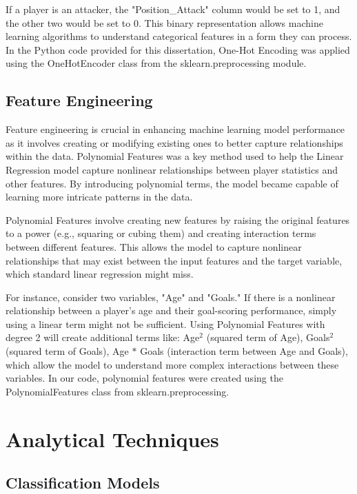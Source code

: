 \documentclass[12pt, a4paper,oneside]{book}
\numberwithin{equation}{section}
\begin{document}
If a player is an attacker, the "Position\_Attack" column would be set to 1, and the other two would be set to 0. This binary representation allows machine learning algorithms to understand categorical features in a form they can process. In the Python code provided for this dissertation, One-Hot Encoding was applied using the OneHotEncoder class from the sklearn.preprocessing module.

\subsection{Feature Engineering}\label{sec:3.1.4}

Feature engineering is crucial in enhancing machine learning model performance \cite{premanand2024} as it involves creating or modifying existing ones to better capture relationships within the data. Polynomial Features was a key method used to help the Linear Regression model capture nonlinear relationships between player statistics and other features. By introducing polynomial terms, the model became capable of learning more intricate patterns in the data.

Polynomial Features involve creating new features by raising the original features to a power \cite{dong2021} (e.g., squaring or cubing them) and creating interaction terms between different features. This allows the model to capture nonlinear relationships that may exist between the input features and the target variable, which standard linear regression might miss.

For instance, consider two variables, "Age" and "Goals." If there is a nonlinear relationship between a player's age and their goal-scoring performance, simply using a linear term might not be sufficient. Using Polynomial Features with degree 2 will create additional terms like: Age\(^2\) (squared term of Age), Goals\(^2\) (squared term of Goals), Age \(*\) Goals (interaction term between Age and Goals), which allow the model to understand more complex interactions between these variables. In our code, polynomial features were created using the PolynomialFeatures class from sklearn.preprocessing.

\section{Analytical Techniques}\label{sec:3.2}

\subsection{Classification Models}
\end{document}
